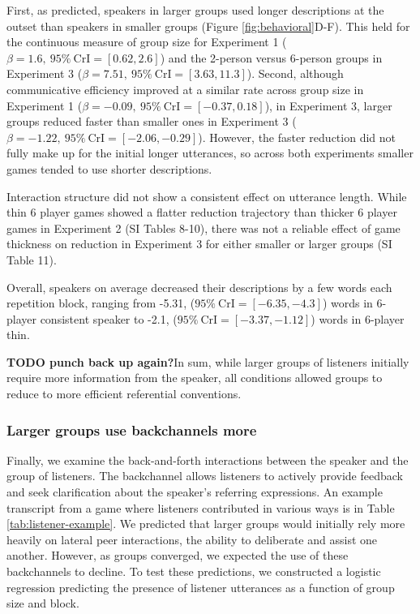 \documentclass[
  english,
]{article}
\begin{document}
First, as predicted, speakers in larger groups used longer descriptions at the outset than speakers in smaller groups (Figure \ref{fig:behavioral}D-F). This held for the continuous measure of group size for Experiment 1 (\(\beta=1.6,\:95\%\:\mathrm{CrI}=[0.62, 2.6]\)) and the 2-person versus 6-person groups in Experiment 3 (\(\beta=7.51,\:95\%\:\mathrm{CrI}=[3.63, 11.3]\)).
Second, although communicative efficiency improved at a similar rate across group size in Experiment 1 (\(\beta=-0.09,\:95\%\:\mathrm{CrI}=[-0.37, 0.18]\)), in Experiment 3, larger groups reduced faster than smaller ones in Experiment 3 (\(\beta=-1.22,\:95\%\:\mathrm{CrI}=[-2.06, -0.29]\)). However, the faster reduction did not fully make up for the initial longer utterances, so across both experiments smaller games tended to use shorter descriptions.

Interaction structure did not show a consistent effect on utterance length. While thin 6 player games showed a flatter reduction trajectory than thicker 6 player games in Experiment 2 (SI Tables 8-10), there was not a reliable effect of game thickness on reduction in Experiment 3 for either smaller or larger groups (SI Table 11).

Overall, speakers on average decreased their descriptions by a few words each repetition block, ranging from -5.31, (\(95\%\:\mathrm{CrI}=[-6.35, -4.3]\)) words in 6-player consistent speaker to -2.1, (\(95\%\:\mathrm{CrI}=[-3.37, -1.12]\)) words in 6-player thin.

\textbf{TODO punch back up again?}In sum, while larger groups of listeners initially require more information from the speaker, all conditions allowed groups to reduce to more efficient referential conventions.

\hypertarget{larger-groups-use-backchannels-more}{%
\subsubsection{Larger groups use backchannels more}\label{larger-groups-use-backchannels-more}}

Finally, we examine the back-and-forth interactions between the speaker and the group of listeners.
The backchannel allows listeners to actively provide feedback and seek clarification about the speaker's referring expressions. An example transcript from a game where listeners contributed in various ways is in Table \ref{tab:listener-example}.
We predicted that larger groups would initially rely more heavily on lateral peer interactions, the ability to deliberate and assist one another.
However, as groups converged, we expected the use of these backchannels to decline.
To test these predictions, we constructed a logistic regression predicting the presence of listener utterances as a function of group size and block.
\end{document}
